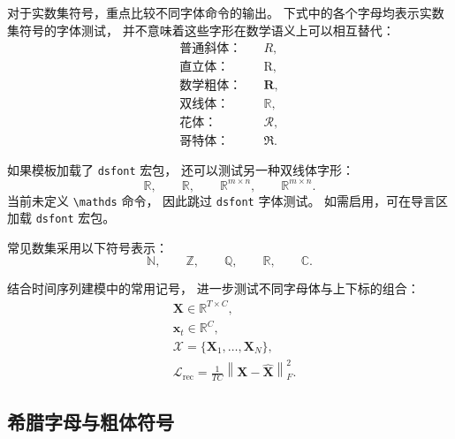 对于实数集符号，重点比较不同字体命令的输出。
下式中的各个字母均表示实数集符号的字体测试，
并不意味着这些字形在数学语义上可以相互替代：
\begin{equation}
  \label{eq:test-symbol-real}
  \begin{aligned}
    \text{普通斜体：}\quad & R,\\
    \text{直立体：}\quad & \mathrm{R},\\
    \text{数学粗体：}\quad & \mathbf{R},\\
    \text{双线体：}\quad & \mathbb{R},\\
    \text{花体：}\quad & \mathcal{R},\\
    \text{哥特体：}\quad & \mathfrak{R}.
  \end{aligned}
\end{equation}

如果模板加载了 \texttt{dsfont} 宏包，
还可以测试另一种双线体字形：
\ifdefined\mathds
\begin{equation}
  \label{eq:test-symbol-dsfont}
  \mathbb{R},\qquad
  \mathds{R},\qquad
  \mathbb{R}^{m\times n},\qquad
  \mathds{R}^{m\times n}.
\end{equation}
\else
当前未定义 \texttt{\textbackslash mathds} 命令，
因此跳过 \texttt{dsfont} 字体测试。
如需启用，可在导言区加载 \texttt{dsfont} 宏包。
\fi

常见数集采用以下符号表示：
\begin{equation}
  \label{eq:test-symbol-number-sets}
  \mathbb{N},\qquad
  \mathbb{Z},\qquad
  \mathbb{Q},\qquad
  \mathbb{R},\qquad
  \mathbb{C}.
\end{equation}

结合时间序列建模中的常用记号，
进一步测试不同字母体与上下标的组合：
\begin{equation}
  \label{eq:test-symbol-model}
  \begin{aligned}
    &\boldsymbol{X}\in\mathbb{R}^{T\times C},\\
    &\boldsymbol{x}_t\in\mathbb{R}^{C},\\
    &\mathcal{X}=\{\boldsymbol{X}_1,\ldots,\boldsymbol{X}_N\},\\
    &\mathcal{L}_{\mathrm{rec}}
      =\frac{1}{TC}
       \left\|\boldsymbol{X}-\widehat{\boldsymbol{X}}\right\|_F^2.
  \end{aligned}
\end{equation}

\subsection{希腊字母与粗体符号}
\label{subsec:symbol-greek}

